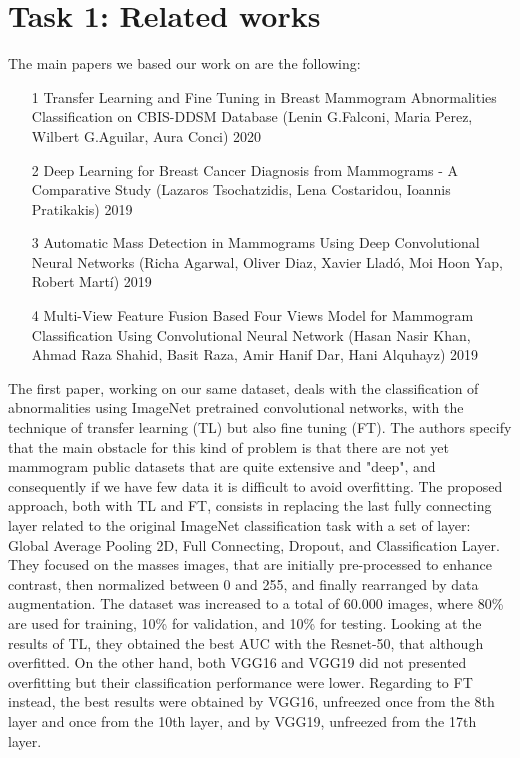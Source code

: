 \documentclass[11pt,a4paper,oneside]{article}
\begin{document}
\section{Task 1: Related works}
The main papers we based our work on are the following:
\begin{itemize}
\item [1] Transfer Learning and Fine Tuning in Breast Mammogram Abnormalities Classification on CBIS-DDSM Database (Lenin G.Falconi, Maria Perez, Wilbert G.Aguilar, Aura Conci) 2020
\item [2] Deep Learning for Breast Cancer Diagnosis from Mammograms - A Comparative Study (Lazaros Tsochatzidis, Lena Costaridou, Ioannis Pratikakis) 2019
\item [3] Automatic Mass Detection in Mammograms Using Deep Convolutional Neural Networks (Richa Agarwal, Oliver Diaz, Xavier Lladó, Moi Hoon Yap, Robert Martí) 2019
\item [4] Multi-View Feature Fusion Based Four Views Model for Mammogram Classification Using Convolutional Neural Network (Hasan Nasir Khan, Ahmad Raza Shahid, Basit Raza,
Amir Hanif Dar, Hani Alquhayz) 2019
\end{itemize}

The first paper, working on our same dataset, deals with the classification of abnormalities using ImageNet pretrained convolutional networks, with the technique of transfer learning (TL) but also fine tuning (FT). The authors specify that the main obstacle for this kind of problem is that there are not yet mammogram public datasets that are quite extensive and "deep", and consequently if we have few data it is difficult to avoid overfitting. The proposed approach, both with TL and FT, consists in replacing the last fully connecting layer related to the original ImageNet classification task with a set of layer: Global Average Pooling 2D, Full Connecting, Dropout, and Classification Layer. They focused on the masses images, that are initially pre-processed to enhance contrast, then normalized between 0 and 255, and finally rearranged by data augmentation. The dataset was increased to a total of 60.000 images, where 80\% are used for training, 10\% for validation, and 10\% for testing. Looking at the results of TL, they obtained the best AUC with the Resnet-50, that although overfitted. On the other hand, both VGG16 and VGG19 did not presented overfitting but their classification performance were lower. Regarding to FT instead, the best results were obtained by VGG16, unfreezed once from the 8th layer and once from the 10th layer, and by VGG19, unfreezed from the 17th layer.
\end{document}

